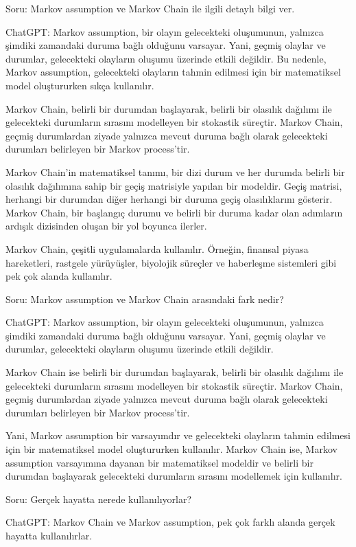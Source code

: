 \documentclass[11pt]{article}
\begin{document}
Soru: Markov assumption ve Markov Chain ile ilgili detaylı bilgi ver.

ChatGPT: Markov assumption, bir olayın gelecekteki oluşumunun, yalnızca şimdiki zamandaki duruma bağlı olduğunu varsayar. Yani, geçmiş olaylar ve durumlar, gelecekteki olayların oluşumu üzerinde etkili değildir. Bu nedenle, Markov assumption, gelecekteki olayların tahmin edilmesi için bir matematiksel model oluştururken sıkça kullanılır.

Markov Chain, belirli bir durumdan başlayarak, belirli bir olasılık dağılımı ile gelecekteki durumların sırasını modelleyen bir stokastik süreçtir. Markov Chain, geçmiş durumlardan ziyade yalnızca mevcut duruma bağlı olarak gelecekteki durumları belirleyen bir Markov process'tir.

Markov Chain'in matematiksel tanımı, bir dizi durum ve her durumda belirli bir olasılık dağılımına sahip bir geçiş matrisiyle yapılan bir modeldir. Geçiş matrisi, herhangi bir durumdan diğer herhangi bir duruma geçiş olasılıklarını gösterir. Markov Chain, bir başlangıç durumu ve belirli bir duruma kadar olan adımların ardışık dizisinden oluşan bir yol boyunca ilerler.

Markov Chain, çeşitli uygulamalarda kullanılır. Örneğin, finansal piyasa hareketleri, rastgele yürüyüşler, biyolojik süreçler ve haberleşme sistemleri gibi pek çok alanda kullanılır.


Soru: Markov assumption ve Markov Chain arasındaki fark nedir?

ChatGPT: Markov assumption, bir olayın gelecekteki oluşumunun, yalnızca şimdiki zamandaki duruma bağlı olduğunu varsayar. Yani, geçmiş olaylar ve durumlar, gelecekteki olayların oluşumu üzerinde etkili değildir.

Markov Chain ise belirli bir durumdan başlayarak, belirli bir olasılık dağılımı ile gelecekteki durumların sırasını modelleyen bir stokastik süreçtir. Markov Chain, geçmiş durumlardan ziyade yalnızca mevcut duruma bağlı olarak gelecekteki durumları belirleyen bir Markov process'tir.

Yani, Markov assumption bir varsayımdır ve gelecekteki olayların tahmin edilmesi için bir matematiksel model oluştururken kullanılır. Markov Chain ise, Markov assumption varsayımına dayanan bir matematiksel modeldir ve belirli bir durumdan başlayarak gelecekteki durumların sırasını modellemek için kullanılır.


Soru: Gerçek hayatta nerede kullanılıyorlar?

ChatGPT: Markov Chain ve Markov assumption, pek çok farklı alanda gerçek hayatta kullanılırlar.
\end{document}
